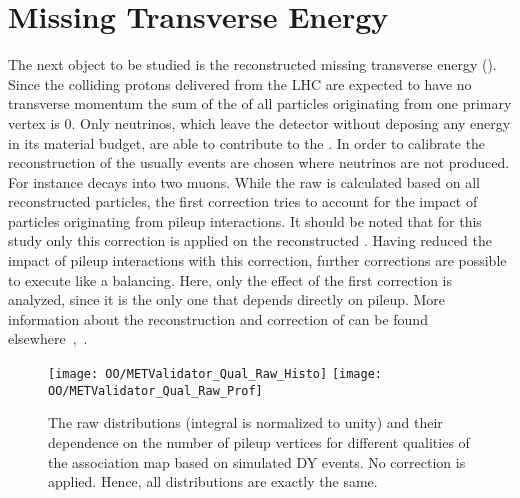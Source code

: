 \section{Missing Transverse Energy \label{sec:OOMet}}

The next object to be studied is the reconstructed missing transverse energy (\MET{}). Since the colliding protons delivered from the LHC are expected to have no transverse momentum the sum of the \pt{} of all particles originating from one primary vertex is 0. Only neutrinos, which leave the detector without deposing any energy in its material budget, are able to contribute to the \MET{}. In order to calibrate the reconstruction of the \MET{} usually events are chosen where neutrinos are not produced. For instance \Zz decays into two muons. While the raw \MET{} is calculated based on all reconstructed particles, the first correction tries to account for the impact of particles originating from pileup interactions. It should be noted that for this study only this correction is applied on the reconstructed \MET{}. Having reduced the impact of pileup interactions with this correction, further corrections are possible to execute like a \pt{} balancing. Here, only the effect of the first correction is analyzed, since it is the only one that depends directly on pileup. More information about the reconstruction and correction of \MET{} can be found elsewhere~\cite{1748-0221-6-09-P09001},~\cite{CMS-PAS-JME-12-002}.

\begin{figure}[Ht]
    \centering
    \texttt{[image: OO/METValidator\_Qual\_Raw\_Histo]}
    \texttt{[image: OO/METValidator\_Qual\_Raw\_Prof]}
    \caption[The raw \MET{} distribution and its dependence on the number of pileup vertices for different association qualities based on simulated DY events]{The raw \MET{} distributions (integral is normalized to unity) and their dependence on the number of pileup vertices for different qualities of the association map based on simulated DY events. No correction is applied. Hence, all distributions are exactly the same. \label{plot:OOMetRaw}}
\end{figure}

